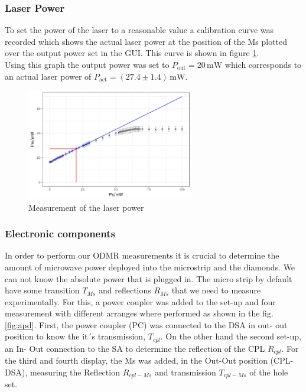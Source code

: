 \subsubsection{Laser Power}
To set the power of the laser to a reasonable value a calibration curve was recorded which shows the actual laser power at the position of the Ms plotted over the output power set in the GUI. This curve is shown in figure \ref{fig:power}.\\

Using this graph the output power was set to $P_\text{out}=20\,\mathrm{mW}$ which corresponds to an actual laser power of $P_\text{act}=(27.4\pm1.4)\,\mathrm{mW}$.
\begin{figure}[hb]
	\centering
	\includegraphics[width=0.65\textwidth]{../figures/powercal.png}
	\caption{Measurement of the laser power}
	\label{fig:power}
\end{figure}


\subsubsection{Electronic components}


In order to perform our ODMR measurements it is crucial to determine the amount of microwave power deployed into the microstrip and the diamonds. We can not know the absolute power that is plugged in. The micro strip by default have some transition $T_{Ms}$ and reflections $R_{Ms}$ that we need to measure experimentally.
For this, a power coupler was added to the set-up and four measurement with different arranges where performed as shown in the fig. \ref{fig:apd}.
First, the power coupler (PC) was connected to the DSA in out- out position to know the it´s transmission, $T_{cpl}$. On the other hand the second set-up, an In- Out connection to the SA to determine the reflection of the CPL $R_{cpl}$. For the third and fourth display, the Ms was added, in the Out-Out position (CPL-DSA), measuring the Reflection $R_{cpl-Ms}$ and transmission $T_{cpl-Ms}$ of the hole set.


